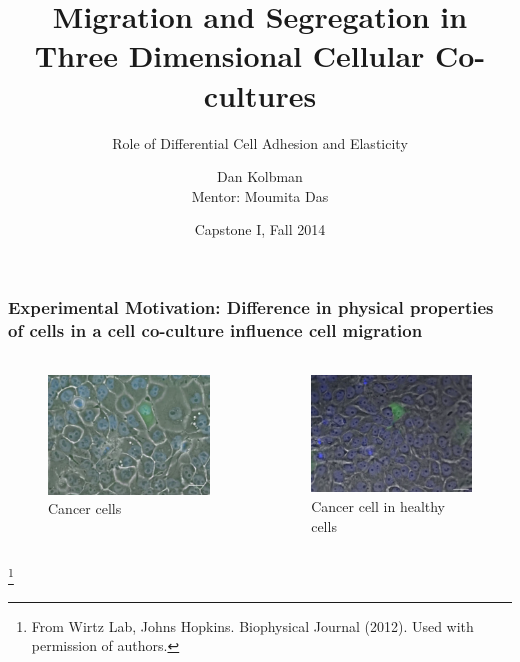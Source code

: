 \documentclass{beamer}
\begin{document}
  \title[Crisis] %
  {Migration and Segregation in Three Dimensional Cellular Co-cultures}
  \subtitle{Role of Differential Cell Adhesion and Elasticity}
  \author[Author, Kolbman] %
  {Dan Kolbman\\Mentor: Moumita Das}
  \date[2014]
  {Capstone I, Fall 2014}
  \subject{info}

  \frame{\titlepage}


  \begin{frame}
    \frametitle{Experimental Motivation: Difference in physical properties of cells in a cell co-culture influence cell migration }
    \framesubtitle{}

	  \begin{columns}[t]
      \begin{figure}
        \includegraphics[width=1.0\textwidth]{cancercancer.png}
        \caption{Cancer cells}
      \end{figure}
      \begin{figure}
        \includegraphics[width=1.0\textwidth]{cancerhealthy.png}
        \caption{Cancer cell in healthy cells}
      \end{figure}
    \end{columns}
    \footnote{From Wirtz Lab, Johns Hopkins. Biophysical Journal (2012). Used with permission of authors.}
    \vfill
    

\end{frame}
\end{document}
